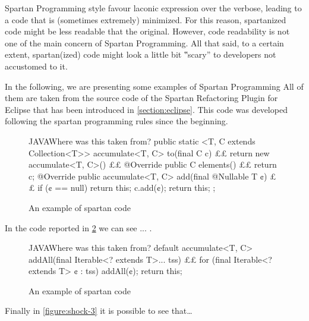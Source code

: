 Spartan Programming style favour laconic expression over the verbose, leading
to a code that is (sometimes extremely) minimized. For this reason, spartanized
code might be less readable that the original. However, code readability is not
one of the main concern of Spartan Programming. All that said, to a certain
extent, spartan(ized) code might look a little bit ‟scary” to developers not
accustomed to it.

In the following, we are presenting some examples of Spartan
Programming %
All of them are taken from the source code of the Spartan Refactoring Plugin
for Eclipse that has been introduced in \cref{section:eclipse}. This code was
developed following the spartan programming rules since the beginning.


\begin{figure}
\label{figure:first}
\caption{An example of spartan code}
\begin{Code}{JAVA}{Where was this taken from?}
public static <T, C extends Collection<T>> accumulate<T, C>
to(final C c) {££
return new accumulate<T, C>() {££
@Override public C elements() {££
return c;
}
@Override public accumulate<T, C>
add(final @Nullable T ¢) {££
if (¢ == null)
return this;
c.add(¢);
return this;
}
};
}
\end{Code}
\end{figure}

In the code reported in \cref{figure:shock-2} we can see ... .

\begin{figure}
\label{figure:shock-2}
\caption{An example of spartan code}
\begin{Code}{JAVA}{Where was this taken from?}
default accumulate<T, C>
addAll(final Iterable<? extends T>... tss) {££
for (final Iterable<? extends T> ¢ : tss)
addAll(¢);
return this;
}
\end{Code}

\end{figure}
Finally in \cref{figure:shock-3} it is possible to see that…



